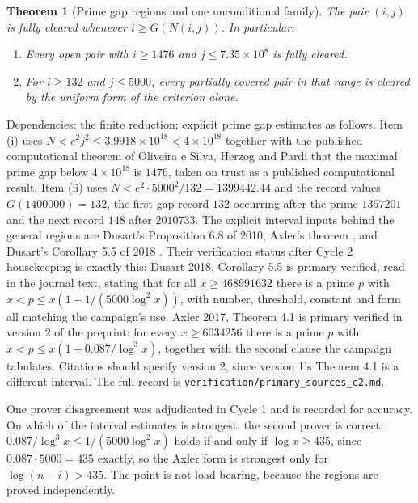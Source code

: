 \documentclass[11pt]{article}
\newtheorem{theorem}{Theorem}[section]
\theoremstyle{remark}
\begin{document}
\begin{theorem}[Prime gap regions and one unconditional family]
\label{thm:S3}
The pair $(i,j)$ is fully cleared whenever $i\ge G(N(i,j))$. In particular:
\begin{enumerate}[label=(\roman*),leftmargin=2.5em]
\item Every open pair with $i\ge 1476$ and $j\le 7.35\times 10^8$ is fully cleared.
\item For $i\ge 132$ and $j\le 5000$, every partially covered pair in that range is cleared by the uniform form of the criterion alone.
\end{enumerate}
\end{theorem}

Dependencies: the finite reduction; explicit prime gap estimates as follows. Item (i) uses $N<e^2j^2\le 3.9918\times 10^{18}<4\times 10^{18}$ together with the published computational theorem of Oliveira e Silva, Herzog and Pardi \cite{OeSHP} that the maximal prime gap below $4\times 10^{18}$ is $1476$, taken on trust as a published computational result. Item (ii) uses $N<e^2\cdot 5000^2/132=1399442.44$ and the record values $G(1400000)=132$, the first gap record $132$ occurring after the prime $1357201$ and the next record $148$ after $2010733$. The explicit interval inputs behind the general regions are Dusart's Proposition 6.8 of 2010, Axler's theorem \cite{Axler}, and Dusart's Corollary 5.5 of 2018 \cite{Dusart2018}. Their verification status after Cycle 2 housekeeping is exactly this: Dusart 2018, Corollary 5.5 is primary verified, read in the journal text, stating that for all $x\ge 468991632$ there is a prime $p$ with $x<p\le x(1+1/(5000\log^2 x))$, with number, threshold, constant and form all matching the campaign's use. Axler 2017, Theorem 4.1 is primary verified in version 2 of the preprint: for every $x\ge 6034256$ there is a prime $p$ with $x<p\le x(1+0.087/\log^3 x)$, together with the second clause the campaign tabulates. Citations should specify version 2, since version 1's Theorem 4.1 is a different interval. The full record is \texttt{verification/primary\_sources\_c2.md}.

One prover disagreement was adjudicated in Cycle 1 and is recorded for accuracy. On which of the interval estimates is strongest, the second prover is correct: $0.087/\log^3 x\le 1/(5000\log^2 x)$ holds if and only if $\log x\ge 435$, since $0.087\cdot 5000=435$ exactly, so the Axler form is strongest only for $\log(n-i)>435$. The point is not load bearing, because the regions are proved independently.
\end{document}
